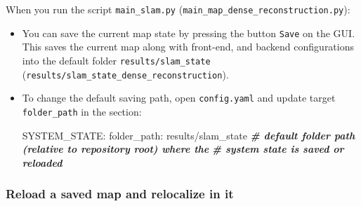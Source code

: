 \documentclass{article}
\newenvironment{Shaded}{\begin{snugshade}}{\end{snugshade}}
\newcommand{\CommentTok}[1]{\textcolor[rgb]{0.00,0.40,1.00}{\textbf{\textit{#1}}}}
\newcommand{\ExtensionTok}[1]{\textcolor[rgb]{0.74,0.68,0.62}{#1}}
\newcommand{\NormalTok}[1]{\textcolor[rgb]{0.74,0.68,0.62}{#1}}
\begin{document}
When you run the script \texttt{main\_slam.py}
(\texttt{main\_map\_dense\_reconstruction.py}): 
\begin{itemize}
\item You can save the
current map state by pressing the button \texttt{Save} on the GUI. This
saves the current map along with front-end, and backend configurations
into the default folder \texttt{results/slam\_state}
(\texttt{results/slam\_state\_dense\_reconstruction}). 
\item To change the
default saving path, open \texttt{config.yaml} and update target
\texttt{folder\_path} in the section:
\begin{scriptsize}
\begin{Shaded}
\begin{Highlighting}[]
\ExtensionTok{SYSTEM_STATE}\NormalTok{:}
  \ExtensionTok{folder_path}\NormalTok{: results/slam_state   }\CommentTok{# default folder path (relative to repository root) where the}
  \ExtensionTok{           }\NormalTok{                       }\CommentTok{# system state is saved or reloaded}
\end{Highlighting}
\end{Shaded}
\end{scriptsize}
\end{itemize}

\hypertarget{reload-a-saved-map-and-relocalize-in-it}{%
\subsubsection{Reload a saved map and relocalize in
it}\label{reload-a-saved-map-and-relocalize-in-it}}
\end{document}
